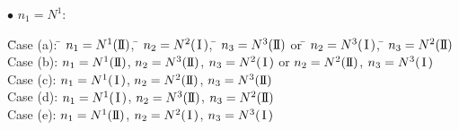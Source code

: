 \documentclass[11pt]{amsart}
\numberwithin{equation}{section} \numberwithin{theorem}{section}
\begin{document}
{
\noindent} $\bullet$ $n_1 = N^1$: 
\begin{tabbing}
	\hspace{7mm} \=Case (a): \= $n_1 = N^1({\text{I \hspace{-2.8mm} I} })$, \= $n_2 = N^2({\hspace{0.5mm}\text{I}\hspace{0.5mm}})$, \= $n_3 = N^3({\text{I \hspace{-2.8mm} I} })$ or \= $n_2 = N^3({\hspace{0.5mm}\text{I}\hspace{0.5mm}})$, \= $n_3 = N^2({\text{I \hspace{-2.8mm} I} })$ \\
	
	\>Case (b): \>$n_1 = N^1({\text{I \hspace{-2.8mm} I} })$, \>$n_2 = N^3({\text{I \hspace{-2.8mm} I} })$, \> $n_3 = N^2({\hspace{0.5mm}\text{I}\hspace{0.5mm}})$ or \>$n_2 = N^2({\text{I \hspace{-2.8mm} I} })$, \> $n_3 = N^3({\hspace{0.5mm}\text{I}\hspace{0.5mm}})$ \\
	
	\>Case (c): \> $n_1 = N^1({\hspace{0.5mm}\text{I}\hspace{0.5mm}})$, \>$n_2 = N^2({\text{I \hspace{-2.8mm} I} })$, \>$n_3 = N^3({\text{I \hspace{-2.8mm} I} })$ \\
	
	\>Case (d): \>$n_1 = N^1({\hspace{0.5mm}\text{I}\hspace{0.5mm}})$, \>$n_2 = N^3({\text{I \hspace{-2.8mm} I} })$, \>$n_3 = N^2({\text{I \hspace{-2.8mm} I} })$\\
	
	\>Case (e): \>$n_1 = N^1({\text{I \hspace{-2.8mm} I} })$, \>$n_2 = N^2({\hspace{0.5mm}\text{I}\hspace{0.5mm}})$, \>$n_3 = N^3({\hspace{0.5mm}\text{I}\hspace{0.5mm}})$\\
	

\end{tabbing}
\end{document}
